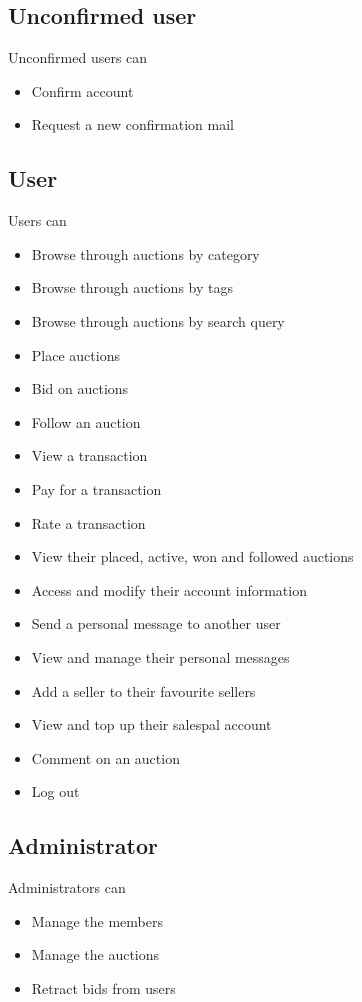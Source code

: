 	\subsection{Unconfirmed user}
		Unconfirmed users can
		\begin{itemize}
			\item Confirm account
			\item Request a new confirmation mail
		\end{itemize}
	\subsection{User}
		Users can
		\begin{itemize}
			\item Browse through auctions by category
			\item Browse through auctions by tags
			\item Browse through auctions by search query
			\item Place auctions
			\item Bid on auctions
			\item Follow an auction
			\item View a transaction
			\item Pay for a transaction
			\item Rate a transaction
			\item View their placed, active, won and followed auctions
			\item Access and modify their account information
			\item Send a personal message to another user
			\item View and manage their personal messages
			\item Add a seller to their favourite sellers
			\item View and top up their salespal account
			\item Comment on an auction
			\item Log out
		\end{itemize}
	\subsection{Administrator}
		Administrators can
		\begin{itemize}
			\item Manage the members
			\item Manage the auctions
			\item Retract bids from users
		\end{itemize}
		
